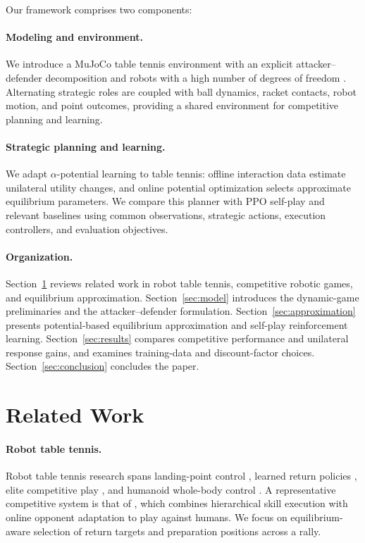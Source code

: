 \documentclass[pmlr]{jmlr}
\begin{document}
Our framework comprises two components:

\paragraph{Modeling and environment.}
We introduce a MuJoCo table tennis environment with an explicit attacker--defender decomposition and robots with a high number of degrees of freedom \citep{todorov2012mujoco}. Alternating strategic roles are coupled with ball dynamics, racket contacts, robot motion, and point outcomes, providing a shared environment for competitive planning and learning.

\paragraph{Strategic planning and learning.}
We adapt $\alpha$-potential learning to table tennis: offline interaction data estimate unilateral utility changes, and online potential optimization selects approximate equilibrium parameters. We compare this planner with PPO self-play and relevant baselines using common observations, strategic actions, execution controllers, and evaluation objectives.

\paragraph{Organization.}
Section~\ref{sec:related} reviews related work in robot table tennis, competitive robotic games, and equilibrium approximation. Section~\ref{sec:model} introduces the dynamic-game preliminaries and the attacker--defender formulation. Section~\ref{sec:approximation} presents potential-based equilibrium approximation and self-play reinforcement learning. Section~\ref{sec:results} compares competitive performance and unilateral response gains, and examines training-data and discount-factor choices. Section~\ref{sec:conclusion} concludes the paper.

\section{Related Work}
\label{sec:related}

\paragraph{Robot table tennis.}
Robot table tennis research spans landing-point control \citep{li2015landing}, learned return policies \citep{gao2020modelfree}, elite competitive play \citep{durr2026ace}, and humanoid whole-body control \citep{su2025hitter}. A representative competitive system is that of \citet{dambrosio2024competitive}, which combines hierarchical skill execution with online opponent adaptation to play against humans. We focus on equilibrium-aware selection of return targets and preparation positions across a rally.
\end{document}

